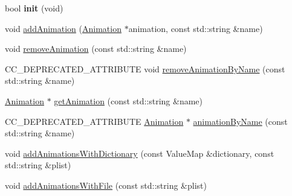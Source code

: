 \begin{DoxyCompactItemize}
bool {\bfseries init} (void)
\item 
void \hyperlink{classAnimationCache_a520a7c0199b75c670195210fa79703d9}{add\+Animation} (\hyperlink{classAnimation}{Animation} $\ast$animation, const std\+::string \&name)
\item 
void \hyperlink{classAnimationCache_a7e3f77ac879a17a8418cdb80aebb2ca7}{remove\+Animation} (const std\+::string \&name)
\item 
C\+C\+\_\+\+D\+E\+P\+R\+E\+C\+A\+T\+E\+D\+\_\+\+A\+T\+T\+R\+I\+B\+U\+TE void \hyperlink{classAnimationCache_a67e8c52d54b5615c58c896eaa617a716}{remove\+Animation\+By\+Name} (const std\+::string \&name)
\item 
\hyperlink{classAnimation}{Animation} $\ast$ \hyperlink{classAnimationCache_aecb29573568d6b08b7ca11591732c527}{get\+Animation} (const std\+::string \&name)
\item 
C\+C\+\_\+\+D\+E\+P\+R\+E\+C\+A\+T\+E\+D\+\_\+\+A\+T\+T\+R\+I\+B\+U\+TE \hyperlink{classAnimation}{Animation} $\ast$ \hyperlink{classAnimationCache_aaf38bd2ec7783124ebe9adfbb146bd23}{animation\+By\+Name} (const std\+::string \&name)
\item 
void \hyperlink{classAnimationCache_a7a67abb700f3f21efcb2f69ed44b886a}{add\+Animations\+With\+Dictionary} (const Value\+Map \&dictionary, const std\+::string \&plist)
\item 
void \hyperlink{classAnimationCache_a1b7464d9c2cd28731d099cb61aa46697}{add\+Animations\+With\+File} (const std\+::string \&plist)
\end{DoxyCompactItemize}

